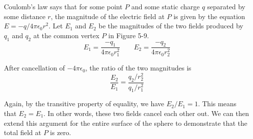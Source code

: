 Coulomb's law says that for some point $P$ and some static charge $q$
separated by some distance $r$, the magnitude of the electric field at $P$ 
is given by the equation $E = -q / 4\pi\epsilon_0 r^2$.
Let $E_1$ and $E_2$ be the magnitudes of the two fields produced by $q_1$ and $q_2$
at the common vertex $P$ in Figure 5-9.
\begin{equation*}
  E_1 = \frac{-q_1}{4 \pi \epsilon_0 r_1^2} \qquad
  E_2 = \frac{-q_2}{4 \pi \epsilon_0 r_2^2}
\end{equation*}

After cancellation of $-4\pi\epsilon_0$, the ratio of the two magnitudes is
\begin{equation*}
  \frac{E_2}{E_1} = \frac{q_2/r_2^2}{q_1/r_1^2}
\end{equation*}

Again, by the transitive property of equality, we have $E_2/E_1 = 1$.
This means that $E_2 = E_1$. In other words, these two fields cancel each other out.
We can then extend this argument for the entire surface of the sphere
to demonstrate that the total field at $P$ is zero.

